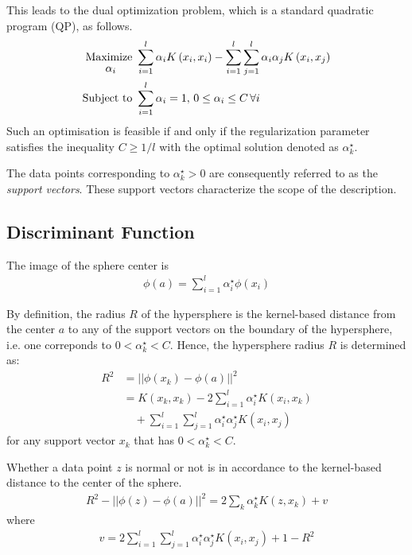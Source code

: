 \documentclass[journal,transmag,times]{IEEEtran}
\begin{document}
This leads to the dual optimization problem, which is a standard quadratic program (QP), as follows.
\begin{subequations}\label{eq:svdd_dual}
\begin{align}
\underset{
	\begin{array}{c}
		 \alpha_i
	\end{array}}{\text{Maximize }} & \sum_{i=1}^l \alpha_i K \left( x_i, x_i \right) - \sum_{i=1}^l \sum_{j=1}^l \alpha_i \alpha_j K \left( x_i, x_j \right)\\
\text{Subject to } & \sum_{i=1}^l \alpha_i = 1, \thinspace 0 \le \alpha_i \le C \thinspace \forall i
\end{align}
\end{subequations}
Such an optimisation is feasible if and only if the regularization parameter satisfies the inequality $C \ge 1{}/l$ with the optimal solution denoted as $\alpha^\star_k$. 

The data points corresponding to $\alpha^\star_k > 0$ are consequently referred to as the \emph{support vectors}. These support vectors characterize the scope of the description.

\subsection{Discriminant Function}

The image of the sphere center is
\begin{align}
\phi \left( a \right) = \sum_{i=1}^l \alpha^\star_i \phi \left( x_i \right)
\end{align}

By definition, the radius $R$ of the hypersphere is the kernel-based distance from the center $a$ to any of the support vectors on the boundary of the hypersphere, i.e. one correponds to $0< \alpha^\star_k < C$. Hence, the hypersphere radius $R$ is determined as:
\begin{align}
R^2 &= \left|\left| \phi \left( x_k \right) - \phi \left( a \right) \right|\right|^2 \nonumber \\
&= K \left( x_k, x_k \right) - 2 \sum_{i=1}^l \alpha^\star_i K \left( x_i, x_k \right)  
\\
&\quad + \sum_{i=1}^l \sum_{j=1}^l \alpha^\star_i \alpha^\star_j K \left( x_i, x_j \right) \nonumber
\end{align}
for any support vector $x_k$ that has $0 < \alpha^\star_k < C$.

Whether a data point $z$ is normal or not is in accordance to the kernel-based distance to the center of the sphere.
\begin{align}
R^2 - \left|\left| \phi \left( z \right) - \phi \left( a \right) \right|\right|^2 = 2 \sum_k \alpha^\star_k K \left( z, x_k \right) + v
\end{align}
where
\begin{align}
v = 2 \sum_{i=1}^l \sum_{j=1}^l \alpha^\star_i \alpha^\star_j K \left( x_i, x_j \right) + 1 - R^2
\end{align}
\end{document}
